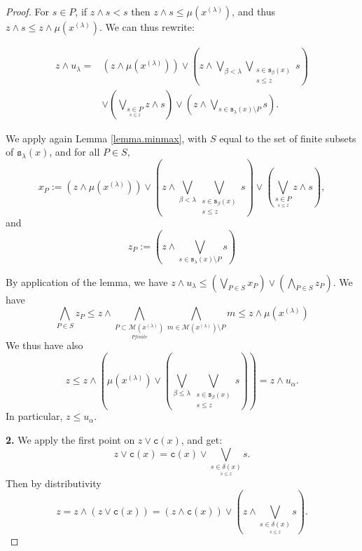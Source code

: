 \documentclass[10pt,a4paper]{amsart}
\begin{document}
\begin{proof}
{For $s \in P$, if $z \wedge s < s$ then $z \wedge s \le \mu(x^{(\lambda)})$, and thus 
$z \wedge s \le z \wedge \mu(x^{(\lambda)})$. We can thus rewrite: 

\[
\begin{aligned}
z \wedge u_{\lambda}
  ={}&(z \wedge \mu(x^{(\lambda)}))
   \vee \left(z \wedge \bigvee_{\beta < \lambda}
        \bigvee_{\substack{s \in \texttt{s}_{\beta}(x)\\ s \le z}} s\right) \\
   &\vee \left(\bigvee_{\underset{s \le z}{s \in P}} z \wedge s\right) \vee \left(z \wedge \bigvee_{s \in \texttt{s}_{\lambda}(x)\setminus P} s\right).
\end{aligned}
\]

We apply again Lemma \ref{lemma.minmax}, with $S$ equal to the set of finite subsets of $\texttt{s}_{\lambda}(x)$, and for all $P \in S$, 
\[x_P := (z \wedge \mu(x^{(\lambda)}))
   \vee \left(z \wedge \bigvee_{\beta < \lambda}
        \bigvee_{\substack{s \in \texttt{s}_{\beta}(x)\\ s \le z}} s\right) \vee \left(\bigvee_{\underset{s \le z}{s \in P}} z \wedge s\right),\]
and 
\[z_P := \left(z \wedge \bigvee_{s \in \texttt{s}_{\lambda}(x)\setminus P} s\right)\]

By application of the lemma, 
we have $z \wedge u_{\lambda} \le \left(\bigvee_{P \in S} x_P\right) \vee \left(\bigwedge_{P \in S} z_P\right)$. We have 
\[\bigwedge_{P \in S} z_P \le z \wedge \bigwedge_{\underset{P finite}{P \subset \mathcal{M}(x^{(\lambda)})}} \bigwedge_{m \in \mathcal{M}(x^{(\lambda)})\setminus P} m \le z \wedge \mu(x^{(\lambda)})\]
We thus have also 
\[z \le z \wedge \left(\mu(x^{(\lambda)}) \vee  \left(\bigvee_{\beta \le \lambda}
        \bigvee_{\substack{s \in \texttt{s}_{\beta}(x)\\ s \le z}} s\right)\right) = z \wedge u_{\alpha}.\]
In particular, $z \le u_{\alpha}$.
}


{
\textbf{2.} We apply the first point on $z \vee \texttt{c}(x)$, and get: 
\[z \vee \texttt{c}(x) = \texttt{c}(x) \vee \bigvee_{\underset{s \le z}{s \in \delta(x)}} s.\]
Then by distributivity 
\[z = z \wedge (z \vee \texttt{c}(x)) = (z \wedge \texttt{c}(x)) \vee \left(z \wedge  \bigvee_{\underset{s \le z}{s \in \delta(x)}} s\right).\]

}
\end{proof}
\end{document}
